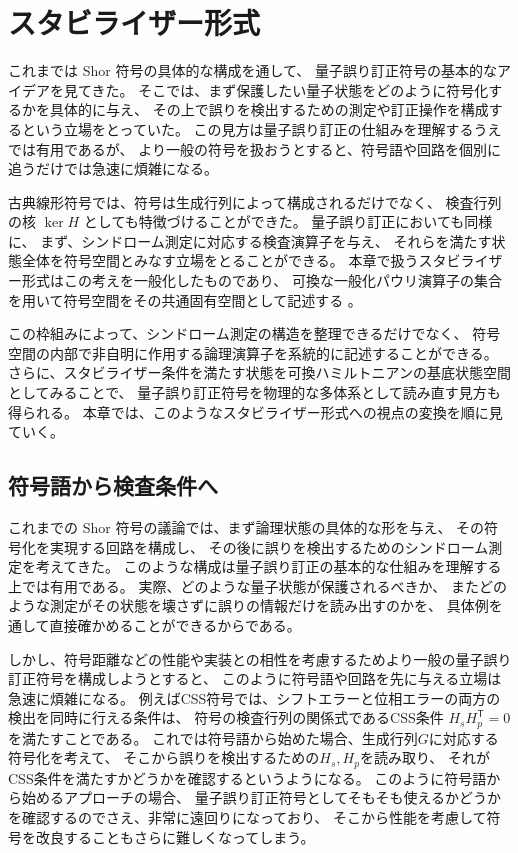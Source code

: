 \documentclass[../master.tex]{subfiles}
\begin{document}
\chapter{スタビライザー形式}
これまでは Shor 符号の具体的な構成を通して、
量子誤り訂正符号の基本的なアイデアを見てきた。
そこでは、まず保護したい量子状態をどのように符号化するかを具体的に与え、
その上で誤りを検出するための測定や訂正操作を構成するという立場をとっていた。
この見方は量子誤り訂正の仕組みを理解するうえでは有用であるが、
より一般の符号を扱おうとすると、符号語や回路を個別に追うだけでは急速に煩雑になる。

古典線形符号では、符号は生成行列によって構成されるだけでなく、
検査行列の核 $\ker H$ としても特徴づけることができた。
量子誤り訂正においても同様に、
まず、シンドローム測定に対応する検査演算子を与え、
それらを満たす状態全体を符号空間とみなす立場をとることができる。
本章で扱うスタビライザー形式はこの考えを一般化したものであり、
可換な一般化パウリ演算子の集合を用いて符号空間をその共通固有空間として記述する
\cite{Gottesman1997-ep,Daniel-Gottesman1999-eh,Bullock2007-jl}。

この枠組みによって、シンドローム測定の構造を整理できるだけでなく、
符号空間の内部で非自明に作用する論理演算子を系統的に記述することができる。
さらに、スタビライザー条件を満たす状態を可換ハミルトニアンの基底状態空間としてみることで、
量子誤り訂正符号を物理的な多体系として読み直す見方も得られる。
本章では、このようなスタビライザー形式への視点の変換を順に見ていく。

\section{符号語から検査条件へ}
これまでの Shor 符号の議論では、まず論理状態の具体的な形を与え、
その符号化を実現する回路を構成し、
その後に誤りを検出するためのシンドローム測定を考えてきた。
このような構成は量子誤り訂正の基本的な仕組みを理解する上では有用である。
実際、どのような量子状態が保護されるべきか、
またどのような測定がその状態を壊さずに誤りの情報だけを読み出すのかを、
具体例を通して直接確かめることができるからである。

しかし、符号距離などの性能や実装との相性を考慮するためより一般の量子誤り訂正符号を構成しようとすると、
このように符号語や回路を先に与える立場は急速に煩雑になる。
例えばCSS符号では、シフトエラーと位相エラーの両方の検出を同時に行える条件は、
符号の検査行列の関係式であるCSS条件 $H_sH_p^\mathsf{T}=0$ を満たすことである。
これでは符号語から始めた場合、生成行列$G$に対応する符号化を考えて、
そこから誤りを検出するための$H_s,H_p$を読み取り、
それがCSS条件を満たすかどうかを確認するというようになる。
このように符号語から始めるアプローチの場合、
量子誤り訂正符号としてそもそも使えるかどうかを確認するのでさえ、非常に遠回りになっており、
そこから性能を考慮して符号を改良することもさらに難しくなってしまう。
\end{document}
